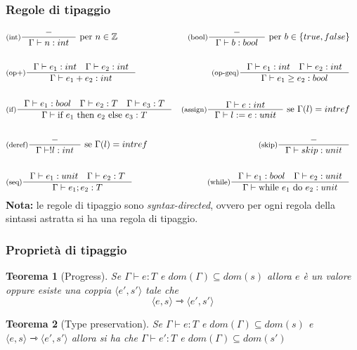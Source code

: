 \documentclass[a4paper, 11pt]{article}
\newtheorem{thm}{Teorema}[section]
\newcommand{\type}{\Gamma \vdash}
\begin{document}
\subsubsection{Regole di tipaggio}
\begin{align*}
	&\inference[(int)]{-}{\type n : int}\ \text{per } n \in \mathbb{Z}  &\inference[(bool)]{-}{\type b : bool}\ \text{per } b \in \lbrace true, false \rbrace \\
	& & \\
	&\inference[(op+)]{\type e_1 : int \quad \type e_2:int}{\type e_1 + e_2 : int} &\inference[(op-geq)]{\type e_1 : int \quad \type e_2:int}{\type e_1 \geq e_2 : bool} \\
	&&\\
	&\inference[(if)]{\type e_1:bool \quad \type e_2:T \quad \type e_3:T}{\type \text{if } e_1 \text{ then } e_2 \text{ else } e_3:T} &\inference[(assign)]{\type e:int}{\type l:=e:unit}\ \text{se } \Gamma(l) = intref \\
	&& \\
	&\inference[(deref)]{-}{\type !l:int}\ \text{se } \Gamma(l) = intref &\inference[(skip)]{-}{\type skip:unit} \\
	&& \\
	&\inference[(seq)]{\type e_1:unit \quad \type e_2:T}{\type e_1;e_2:T} &\inference[(while)]{\type e_1:bool \quad \type e_2:unit}{\type \text{while } e_1 \text{ do } e_2:unit}
	&& \\
\end{align*}
\textbf{Nota:} le regole di tipaggio sono \textit{syntax-directed}, ovvero per ogni regola della sintassi astratta si ha una regola di tipaggio.

\subsubsection{Proprietà di tipaggio}
\begin{thm}[Progress]
	Se $\type e:T$ e $dom(\Gamma) \subseteq dom(s)$ allora $e$ è un valore oppure esiste una coppia $\langle e',s' \rangle$ tale che \[ \langle e,s \rangle \rightarrowtriangle \langle e',s' \rangle \]
\end{thm}

\begin{thm}[Type preservation]
	Se $\type e:T$ e $dom(\Gamma) \subseteq dom(s)$ e $\langle e,s \rangle \rightarrowtriangle \langle e',s' \rangle$ allora si ha che $ \type e':T$ e $dom(\Gamma) \subseteq dom(s') $
\end{thm}
\end{document}
